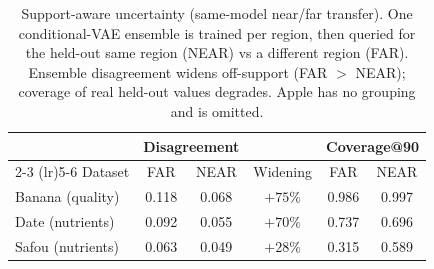 \begin{table}[t]
\centering
\caption{Support-aware uncertainty (same-model near/far transfer). One conditional-VAE ensemble is trained per region, then queried for the held-out same region (NEAR) vs a different region (FAR). Ensemble disagreement widens off-support (FAR $>$ NEAR); coverage of real held-out values degrades. Apple has no grouping and is omitted.}
\label{tab:nearfar}
\begin{tabular}{l cc c cc}
\toprule
 & \multicolumn{2}{c}{Disagreement} & & \multicolumn{2}{c}{Coverage@90} \\
\cmidrule(lr){2-3} \cmidrule(lr){5-6}
Dataset & FAR & NEAR & Widening & FAR & NEAR \\
\midrule
Banana (quality) & 0.118 & 0.068 & $+75\%$ & 0.986 & 0.997 \\
Date (nutrients) & 0.092 & 0.055 & $+70\%$ & 0.737 & 0.696 \\
Safou (nutrients) & 0.063 & 0.049 & $+28\%$ & 0.315 & 0.589 \\
\bottomrule
\end{tabular}
\end{table}
